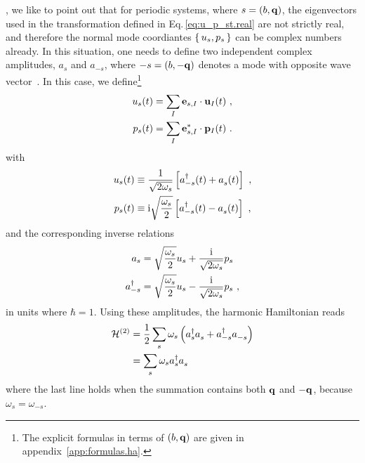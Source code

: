 , we like to point out that for periodic systems, where $s=(b, {\bf q})$, the eigenvectors used in the transformation defined in Eq.\,\eqref{eq:u_p_st.real} are not strictly real, and therefore the normal mode coordiantes $\set{u_s, p_s}$ can be complex numbers already. In this situation, one needs to define two independent complex amplitudes, $a_s$ and $a_{-s}$, where $-s = (b, - {\bf q})$ denotes a mode with opposite wave vector~\cite[p.\,300]{BornHuang}. In this case, we define\footnote{The explicit formulas in terms of $(b, {\bf q})$ are given in appendix~\ref{app:formulas.ha}.}
\begin{subequations}
	\label{eq:u_s.periodic}
\begin{align}
u_s (t)
&= \sum_{I} {\bf e}_{s, I} \cdot {\bf u}_{I} (t)~,
\label{eq:u_st)} \\
p_s (t)
&=\sum_{I} {\bf e}^\ast_{s, I} \cdot {\bf p}_{I} (t) ~.
\label{eq:p_st.periodic}
\end{align}
\end{subequations}
with
\begin{subequations}
	\label{eq:u_s.amplitudes.periodic}
	\begin{align}
	u_s (t) 
	&\equiv \frac{1}{\sqrt{2 \omega_{s}}} \left[ \D a_{-s} (t) + \fD a_s (t) \right]~, \\
	p_s (t) 
	&\equiv \im \sqrt{\frac{\omega_s}{2}} \left[ \D a_{-s} (t) - \fD a_s (t) \right]~,
	\end{align}
\end{subequations}
and the corresponding inverse relations
\begin{subequations}
	\label{eq:a(q)}
	\begin{align}
	a_s
	&= \sqrt{\frac{\omega_s}{2}} u_s + \frac{{\rm i}}{\sqrt{2 \omega_s}} p_s \\
	a^\dagger_{-s}
	&= \sqrt{\frac{\omega_s}{2}} u_s - \frac{{\rm i}}{\sqrt{2 \omega_s}} p_s~,
	\end{align}
\end{subequations}
in units where $\hbar = 1$. Using these amplitudes, the harmonic Hamiltonian reads
\begin{align}
	\mathcal{H}^{(2)}
		&= \halb \sum_s \omega_s \left( \D a_s \fD a_s + \D a_{-s} \fD a_{-s} \right) \\
		&= \sum_s \omega_s \D a_s \fD a_s
\end{align}
where the last line holds when the summation contains both $\bf q$ and $- {\bf q}$, because $\omega_s = \omega_{-s}$.


